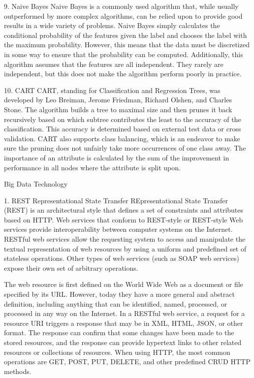 9. Naive Bayes  Naive Bayes is a commonly used algorithm that, while usually
outperformed by more complex algorithms, can be relied
upon to provide good results in a wide variety of problems.
Naive Bayes simply calculates the conditional probability of
the features given the label and chooses the label with the
maximum probability. However, this means that the data must
be discretized in some way to ensure that the probability can
be computed. Additionally, this algorithm assumes that the
features are all independent. They rarely are independent, but
this does not make the algorithm perform poorly in practice.

10. CART  CART, standing for Classification and Regression Trees, was
developed by Leo Breiman, Jerome Friedman, Richard Olshen,
and Charles Stone. The algorithm builds a tree to maximal
size and then prunes it back recursively based on which
subtree contributes the least to the accuracy of the classification.
This accuracy is determined based on external test data or
cross validation. CART also supports class balancing, which
is an endeavor to make sure the pruning does not unfairly
take more occurrences of one class away. The importance of
an attribute is calculated by the sum of the improvement in
performance in all nodes where the attribute is split upon.

Big Data Technology

1. REST Representational State Transfer
REpresentational State Transfer (REST) is an architectural style 
that defines a set of constraints and attributes based on HTTP. 
Web services that conform to REST-style or REST-style Web 
services provide interoperability between computer systems on the 
Internet. RESTful web services allow the requesting system to 
access and manipulate the textual representation of web resources 
by using a uniform and predefined set of stateless operations. 
Other types of web services (such as SOAP web services) expose 
their own set of arbitrary operations.

The web resource is first defined on the World Wide Web as a 
document or file specified by its URL. However, today they have a 
more general and abstract definition, including anything that can 
be identified, named, processed, or processed in any way on the 
Internet. In a RESTful web service, a request for a resource URI 
triggers a response that may be in XML, HTML, JSON, or other 
format. The response can confirm that some changes have been made 
to the stored resources, and the response can provide hypertext 
links to other related resources or collections of resources. 
When using HTTP, the most common operations are GET, POST, PUT, 
DELETE, and other predefined CRUD HTTP methods.

